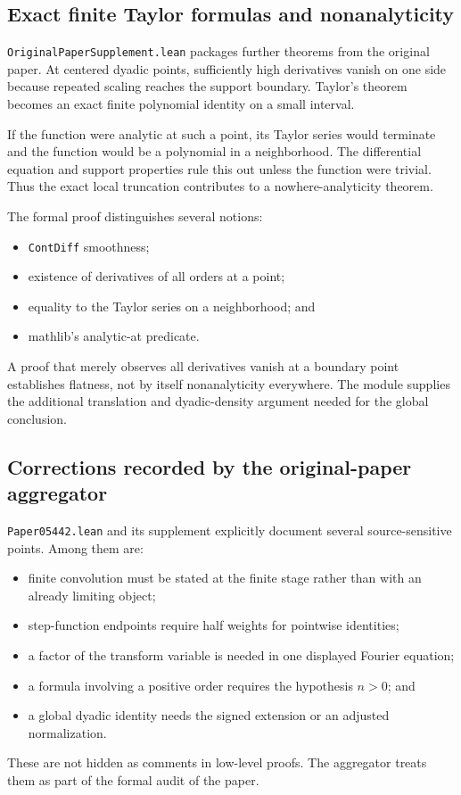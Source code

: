 \documentclass[11pt,oneside]{article}
\theoremstyle{definition}
\theoremstyle{remark}
\begin{document}
\subsection{Exact finite Taylor formulas and nonanalyticity}
\nolinkurl{OriginalPaperSupplement.lean} packages further theorems from the original paper.  At centered dyadic points, sufficiently high derivatives vanish on one side because repeated scaling reaches the support boundary.  Taylor's theorem becomes an exact finite polynomial identity on a small interval.

If the function were analytic at such a point, its Taylor series would terminate and the function would be a polynomial in a neighborhood.  The differential equation and support properties rule this out unless the function were trivial.  Thus the exact local truncation contributes to a nowhere-analyticity theorem.

The formal proof distinguishes several notions:
\begin{itemize}
  \item \nolinkurl{ContDiff} smoothness;
  \item existence of derivatives of all orders at a point;
  \item equality to the Taylor series on a neighborhood; and
  \item mathlib's analytic-at predicate.
\end{itemize}
A proof that merely observes all derivatives vanish at a boundary point establishes flatness, not by itself nonanalyticity everywhere.  The module supplies the additional translation and dyadic-density argument needed for the global conclusion.

\subsection{Corrections recorded by the original-paper aggregator}
\nolinkurl{Paper05442.lean} and its supplement explicitly document several source-sensitive points.  Among them are:
\begin{itemize}
  \item finite convolution must be stated at the finite stage rather than with an already limiting object;
  \item step-function endpoints require half weights for pointwise identities;
  \item a factor of the transform variable is needed in one displayed Fourier equation;
  \item a formula involving a positive order requires the hypothesis \(n>0\); and
  \item a global dyadic identity needs the signed extension or an adjusted normalization.
\end{itemize}
These are not hidden as comments in low-level proofs.  The aggregator treats them as part of the formal audit of the paper.
\end{document}
